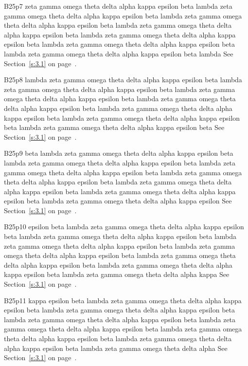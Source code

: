 B25p7 zeta gamma omega theta delta alpha kappa epsilon beta lambda zeta gamma omega theta delta alpha kappa epsilon beta lambda zeta gamma omega theta delta alpha kappa epsilon beta lambda zeta gamma omega theta delta alpha kappa epsilon beta lambda zeta gamma omega theta delta alpha kappa epsilon beta lambda zeta gamma omega theta delta alpha kappa epsilon beta lambda zeta gamma omega theta delta alpha kappa epsilon beta lambda See Section~\ref{s:3.1} on page~\pageref{s:3.1}.

B25p8 lambda zeta gamma omega theta delta alpha kappa epsilon beta lambda zeta gamma omega theta delta alpha kappa epsilon beta lambda zeta gamma omega theta delta alpha kappa epsilon beta lambda zeta gamma omega theta delta alpha kappa epsilon beta lambda zeta gamma omega theta delta alpha kappa epsilon beta lambda zeta gamma omega theta delta alpha kappa epsilon beta lambda zeta gamma omega theta delta alpha kappa epsilon beta See Section~\ref{s:3.1} on page~\pageref{s:3.1}.

B25p9 beta lambda zeta gamma omega theta delta alpha kappa epsilon beta lambda zeta gamma omega theta delta alpha kappa epsilon beta lambda zeta gamma omega theta delta alpha kappa epsilon beta lambda zeta gamma omega theta delta alpha kappa epsilon beta lambda zeta gamma omega theta delta alpha kappa epsilon beta lambda zeta gamma omega theta delta alpha kappa epsilon beta lambda zeta gamma omega theta delta alpha kappa epsilon See Section~\ref{s:3.1} on page~\pageref{s:3.1}.

B25p10 epsilon beta lambda zeta gamma omega theta delta alpha kappa epsilon beta lambda zeta gamma omega theta delta alpha kappa epsilon beta lambda zeta gamma omega theta delta alpha kappa epsilon beta lambda zeta gamma omega theta delta alpha kappa epsilon beta lambda zeta gamma omega theta delta alpha kappa epsilon beta lambda zeta gamma omega theta delta alpha kappa epsilon beta lambda zeta gamma omega theta delta alpha kappa See Section~\ref{s:3.1} on page~\pageref{s:3.1}.

B25p11 kappa epsilon beta lambda zeta gamma omega theta delta alpha kappa epsilon beta lambda zeta gamma omega theta delta alpha kappa epsilon beta lambda zeta gamma omega theta delta alpha kappa epsilon beta lambda zeta gamma omega theta delta alpha kappa epsilon beta lambda zeta gamma omega theta delta alpha kappa epsilon beta lambda zeta gamma omega theta delta alpha kappa epsilon beta lambda zeta gamma omega theta delta alpha See Section~\ref{s:3.1} on page~\pageref{s:3.1}.

